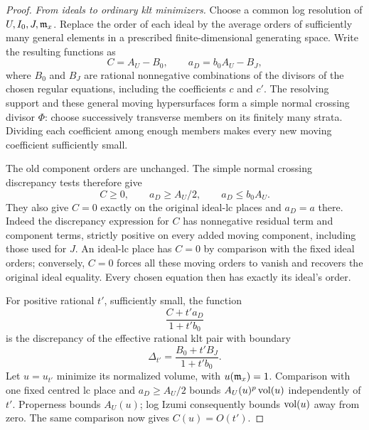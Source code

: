 \begin{proof}
\emph{From ideals to ordinary klt minimizers.}
Choose a common log resolution of \(U,I_0,J,\mathfrak m_x\).
Replace the order of each ideal by the average orders of sufficiently
many general elements in a prescribed finite-dimensional generating
space. Write the resulting functions as
\[
                C=A_U-B_0,\qquad a_D=b_0A_U-B_J,
\]
where \(B_0\) and \(B_J\) are rational nonnegative combinations of the
divisors of the chosen regular equations, including the coefficients
\(c\) and \(c'\). The resolving support and these general moving
hypersurfaces form a simple normal crossing divisor \(\Phi\):
choose successively transverse members on its finitely many strata.
Dividing each coefficient among enough members makes every new
moving coefficient sufficiently small.

The old component orders are unchanged. The simple normal crossing
discrepancy tests therefore give
\[
             C\geq0,\qquad a_D\geq A_U/2,\qquad a_D\leq b_0A_U.
\]
They also give \(C=0\) exactly on the original ideal-lc places and
\(a_D=a\) there. Indeed the discrepancy expression for \(C\) has
nonnegative residual term and component terms, strictly positive on
every added moving component, including those used for \(J\).
An ideal-lc place has \(C=0\) by comparison with the fixed ideal orders;
conversely, \(C=0\) forces all these moving orders to vanish and recovers
the original ideal equality. Every chosen equation then has exactly its
ideal's order.

For positive rational \(t'\), sufficiently small, the function
\[
                         \frac{C+t'a_D}{1+t'b_0}
\]
is the discrepancy of the effective rational klt pair with boundary
\[
                    \Delta_{t'}=\frac{B_0+t'B_J}{1+t'b_0}.
\]
Let \(u=u_{t'}\) minimize its normalized volume, with \(u(\mathfrak m_x)=1\).
Comparison with one fixed centred lc place and \(a_D\geq A_U/2\)
bounds \(A_U(u)^p\operatorname{vol}(u)\) independently of \(t'\).
Properness bounds \(A_U(u)\); log Izumi consequently bounds
\(\operatorname{vol}(u)\) away from zero. The same comparison now gives
\(C(u)=O(t')\).


\end{proof}
